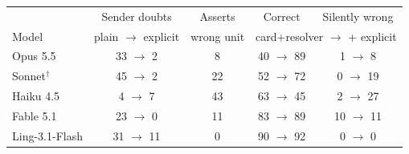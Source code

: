 \begin{tabular}{lcccc}
\toprule
 & Sender doubts & Asserts & Correct & Silently wrong \\
Model & plain $\to$ explicit & wrong unit & \multicolumn{2}{c}{card+resolver $\to$ + explicit} \\
\midrule
Opus 5.5 & 33 $\to$ 2 & 8 & 40 $\to$ 89 & 1 $\to$ 8 \\
Sonnet$^\dagger$ & 45 $\to$ 2 & 22 & 52 $\to$ 72 & 0 $\to$ 19 \\
Haiku 4.5 & 4 $\to$ 7 & 43 & 63 $\to$ 45 & 2 $\to$ 27 \\
Fable 5.1 & 23 $\to$ 0 & 11 & 83 $\to$ 89 & 10 $\to$ 11 \\
Ling-3.1-Flash & 31 $\to$ 11 & 0 & 90 $\to$ 92 & 0 $\to$ 0 \\
\bottomrule
\end{tabular}
